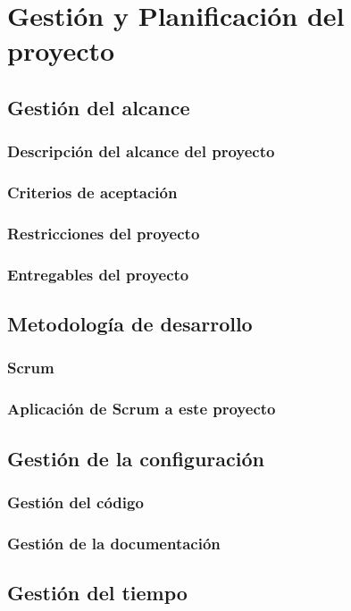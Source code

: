 \chapter{Gestión y Planificación del proyecto}

\section{Gestión del alcance}
\subsection{Descripción del alcance del proyecto}
\subsection{Criterios de aceptación}
\subsection{Restricciones del proyecto}
\subsection{Entregables del proyecto}

\section{Metodología de desarrollo}
\subsection{Scrum}
\subsection{Aplicación de Scrum a este proyecto}

\section{Gestión de la configuración}
\subsection{Gestión del código}
\subsection{Gestión de la documentación}

\section{Gestión del tiempo}
